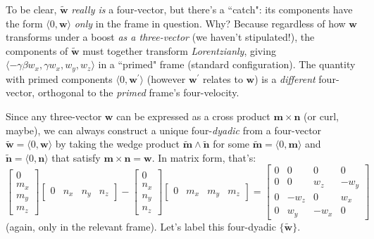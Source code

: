 \documentclass[12pt]{article}
\renewcommand{\vv}[1]{\mathbf{#1}}
\begin{document}
To be clear, $\tilde{\vv w}$ \emph{really is} a four-vector, but there's a ``catch": its components have the form $\langle 0, \vv w \rangle$ \emph{only} in the frame in question. Why? Because regardless of how $\vv w$ transforms under a boost \emph{as a three-vector} (we haven't stipulated!), the components of $\tilde{\vv w}$ must together transform \emph{Lorentzianly}, giving $\langle - \gamma \beta w_x, \gamma w_x, w_y, w_z \rangle$ in a ``primed" frame (standard configuration). The quantity with primed components $\langle 0, \vv w ^\prime \rangle$ (however $\vv w ^\prime$ relates to $\vv w$) is a \emph{different} four-vector, orthogonal to the \emph{primed} frame's four-velocity.

Since any three-vector $\vv w$ can be expressed as a cross product ${ \vv m \times \vv n }$ (or curl, maybe), we can always construct a unique four-\emph{dyadic} from a four-vector $\tilde{\vv w} = \langle 0, \vv w \rangle$ by taking the wedge product $\tilde{\vv m} \wedge \tilde{\vv n}$ for some $\tilde{\vv m} = \langle 0, \vv m \rangle$ and $\tilde{\vv n} = \langle 0, \vv n \rangle$ that satisfy ${ \vv m \times \vv n = \vv w }$. In matrix form, that's:
\begin{equation*}
\begin{bmatrix}
0 \\
m_x \\
m_y \\
m_z
\end{bmatrix}
\begin{bmatrix}
0 & n_x & n_y & n_z
\end{bmatrix}
-
\begin{bmatrix}
0 \\
n_x \\
n_y \\
n_z
\end{bmatrix}
\begin{bmatrix}
0 & m_x & m_y & m_z
\end{bmatrix}
=
\begin{bmatrix}
0 & 0 & 0 & 0 \\
0 & 0 & w_z & -w_y \\
0 & -w_z & 0 & w_x \\
0 & w_y & -w_x & 0
\end{bmatrix}
\end{equation*}
(again, only in the relevant frame). Let's label this four-dyadic $\{ \tilde{\vv w} \}$.
\end{document}
